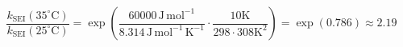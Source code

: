 \documentclass[preview]{standalone}
\begin{document}
\[
\frac{k_{\mathrm{SEI}}(35^\circ\mathrm{C})}{k_{\mathrm{SEI}}(25^\circ\mathrm{C})}
= \exp\left(
\frac{60000\,\mathrm{J\,mol^{-1}}}{8.314\,\mathrm{J\,mol^{-1}\,K^{-1}}}
\cdot
\frac{10\mathrm{K}}{298 \cdot 308\mathrm{K}^2}
\right)
= \exp(0.786) \approx 2.19
\]
\end{document}
